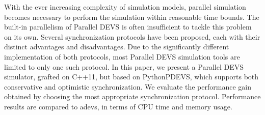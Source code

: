 With the ever increasing complexity of simulation models, parallel simulation
becomes necessary to perform the simulation within reasonable time bounds.
The built-in parallelism of Parallel DEVS is often insufficient to tackle this problem on its own.
Several synchronization protocols have been proposed, each with their distinct advantages and disadvantages.
Due to the significantly different implementation of both protocols, most Parallel DEVS simulation tools are limited to only one such protocol.
In this paper, we present a Parallel DEVS simulator, grafted on C++11, but based on PythonPDEVS, which supports both conservative and optimistic synchronization.
We evaluate the performance gain obtained by choosing the most appropriate synchronization protocol.
Performance results are compared to adevs, in terms of CPU time and memory usage.
